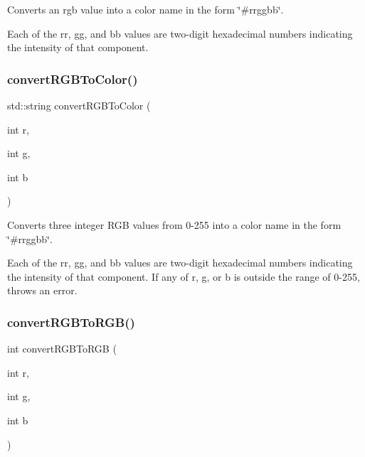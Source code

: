 Converts an {\ttfamily rgb} value into a color name in the form {\ttfamily \char`\"{}\#rrggbb\char`\"{}}. 

Each of the {\ttfamily rr}, {\ttfamily gg}, and {\ttfamily bb} values are two-\/digit hexadecimal numbers indicating the intensity of that component. \mbox{\label{classGColor_a906729a293e62f8d112037016af21f9f}} 
\subsubsection{\texorpdfstring{convert\+R\+G\+B\+To\+Color()}{convertRGBToColor()}\hspace{0.1cm}{\footnotesize\ttfamily [2/2]}}
{\footnotesize\ttfamily std\+::string convert\+R\+G\+B\+To\+Color (\begin{DoxyParamCaption}\item[{int}]{r,  }\item[{int}]{g,  }\item[{int}]{b }\end{DoxyParamCaption})\hspace{0.3cm}{\ttfamily [static]}}



Converts three integer R\+GB values from 0-\/255 into a color name in the form {\ttfamily \char`\"{}\#rrggbb\char`\"{}}. 

Each of the {\ttfamily rr}, {\ttfamily gg}, and {\ttfamily bb} values are two-\/digit hexadecimal numbers indicating the intensity of that component. If any of r, g, or b is outside the range of 0-\/255, throws an error. \mbox{\label{classGColor_a7c4acb134cfa913f8a127b300a4b10a0}} 
\subsubsection{\texorpdfstring{convert\+R\+G\+B\+To\+R\+G\+B()}{convertRGBToRGB()}}
{\footnotesize\ttfamily int convert\+R\+G\+B\+To\+R\+GB (\begin{DoxyParamCaption}\item[{int}]{r,  }\item[{int}]{g,  }\item[{int}]{b }\end{DoxyParamCaption})\hspace{0.3cm}{\ttfamily [static]}}



